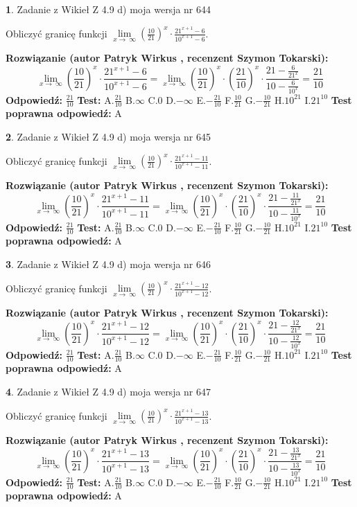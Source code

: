 \documentclass[12pt, a4paper]{article}
\theoremstyle{definition} %
\newtheorem{zad}{}
\newcommand{\zadStart}[1]{\begin{zad}#1\newline}
\newcommand{\zadStop}{\end{zad}}
\newcommand{\rozwStart}[2]{\noindent \textbf{Rozwiązanie (autor #1 , recenzent #2): }\newline}
\newcommand{\rozwStop}{\newline}
\newcommand{\odpStart}{\noindent \textbf{Odpowiedź:}\newline}
\newcommand{\odpStop}{\newline}
\newcommand{\testStart}{\noindent \textbf{Test:}\newline}
\newcommand{\testStop}{\newline}
\newcommand{\kluczStart}{\noindent \textbf{Test poprawna odpowiedź:}\newline}
\newcommand{\kluczStop}{\newline}
\begin{document}
\zadStart{Zadanie z Wikieł Z 4.9 d) moja wersja nr 644}


Obliczyć granicę funkcji  $\lim\limits_{x\to\ \infty}(\frac{10}{21})^{x}\cdot\frac{21^{x+1}-6}{10^{x+1}-6}$.
\zadStop
\rozwStart{Patryk Wirkus}{Szymon Tokarski}
$$\lim\limits_{x\to\ \infty}(\frac{10}{21})^{x}\cdot\frac{21^{x+1}-6}{10^{x+1}-6}=\lim\limits_{x\to\ \infty}(\frac{10}{21})^{x}\cdot(\frac{21}{10})^{x} \cdot \frac{21-\frac{6}{21^{x}}}{10-\frac{6}{10^{x}}} = \frac{21}{10}$$
\rozwStop
\odpStart
$\frac{21}{10}$
\odpStop
\testStart
A.$\frac{21}{10}$ B.$\infty$ C.$0$ D.$-\infty$ E.$-\frac{21}{10}$
F.$\frac{10}{21}$ G.$-\frac{10}{21}$
H.$10^{21}$
I.$21^{10}$
\testStop
\kluczStart
A
\kluczStop



\zadStart{Zadanie z Wikieł Z 4.9 d) moja wersja nr 645}


Obliczyć granicę funkcji  $\lim\limits_{x\to\ \infty}(\frac{10}{21})^{x}\cdot\frac{21^{x+1}-11}{10^{x+1}-11}$.
\zadStop
\rozwStart{Patryk Wirkus}{Szymon Tokarski}
$$\lim\limits_{x\to\ \infty}(\frac{10}{21})^{x}\cdot\frac{21^{x+1}-11}{10^{x+1}-11}=\lim\limits_{x\to\ \infty}(\frac{10}{21})^{x}\cdot(\frac{21}{10})^{x} \cdot \frac{21-\frac{11}{21^{x}}}{10-\frac{11}{10^{x}}} = \frac{21}{10}$$
\rozwStop
\odpStart
$\frac{21}{10}$
\odpStop
\testStart
A.$\frac{21}{10}$ B.$\infty$ C.$0$ D.$-\infty$ E.$-\frac{21}{10}$
F.$\frac{10}{21}$ G.$-\frac{10}{21}$
H.$10^{21}$
I.$21^{10}$
\testStop
\kluczStart
A
\kluczStop



\zadStart{Zadanie z Wikieł Z 4.9 d) moja wersja nr 646}


Obliczyć granicę funkcji  $\lim\limits_{x\to\ \infty}(\frac{10}{21})^{x}\cdot\frac{21^{x+1}-12}{10^{x+1}-12}$.
\zadStop
\rozwStart{Patryk Wirkus}{Szymon Tokarski}
$$\lim\limits_{x\to\ \infty}(\frac{10}{21})^{x}\cdot\frac{21^{x+1}-12}{10^{x+1}-12}=\lim\limits_{x\to\ \infty}(\frac{10}{21})^{x}\cdot(\frac{21}{10})^{x} \cdot \frac{21-\frac{12}{21^{x}}}{10-\frac{12}{10^{x}}} = \frac{21}{10}$$
\rozwStop
\odpStart
$\frac{21}{10}$
\odpStop
\testStart
A.$\frac{21}{10}$ B.$\infty$ C.$0$ D.$-\infty$ E.$-\frac{21}{10}$
F.$\frac{10}{21}$ G.$-\frac{10}{21}$
H.$10^{21}$
I.$21^{10}$
\testStop
\kluczStart
A
\kluczStop



\zadStart{Zadanie z Wikieł Z 4.9 d) moja wersja nr 647}


Obliczyć granicę funkcji  $\lim\limits_{x\to\ \infty}(\frac{10}{21})^{x}\cdot\frac{21^{x+1}-13}{10^{x+1}-13}$.
\zadStop
\rozwStart{Patryk Wirkus}{Szymon Tokarski}
$$\lim\limits_{x\to\ \infty}(\frac{10}{21})^{x}\cdot\frac{21^{x+1}-13}{10^{x+1}-13}=\lim\limits_{x\to\ \infty}(\frac{10}{21})^{x}\cdot(\frac{21}{10})^{x} \cdot \frac{21-\frac{13}{21^{x}}}{10-\frac{13}{10^{x}}} = \frac{21}{10}$$
\rozwStop
\odpStart
$\frac{21}{10}$
\odpStop
\testStart
A.$\frac{21}{10}$ B.$\infty$ C.$0$ D.$-\infty$ E.$-\frac{21}{10}$
F.$\frac{10}{21}$ G.$-\frac{10}{21}$
H.$10^{21}$
I.$21^{10}$
\testStop
\kluczStart
A
\kluczStop
\end{document}
